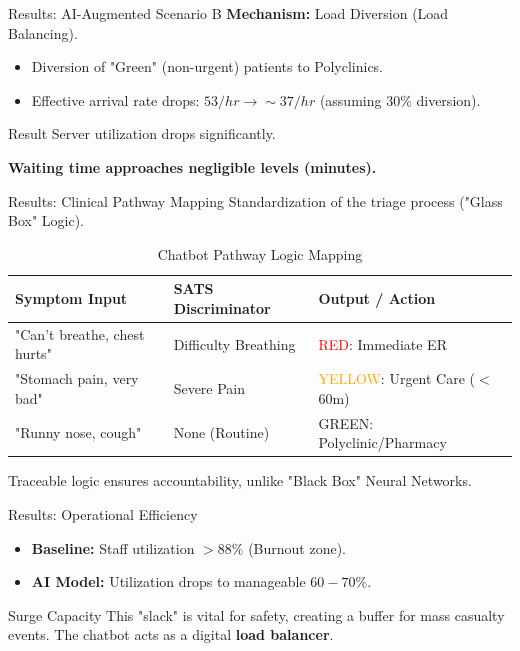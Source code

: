 \documentclass[aspectratio=169,12pt]{beamer}
\newcommand{\bcol}[2][blue]{\textcolor{#1}{#2}}
\begin{document}
	\begin{frame}{Results: AI-Augmented Scenario B}
		\textbf{Mechanism:} Load Diversion (Load Balancing).
		
		\begin{itemize}
			\item Diversion of "Green" (non-urgent) patients to Polyclinics.
			\item Effective arrival rate drops: $53/hr \to \sim 37/hr$ (assuming 30\% diversion).
		\end{itemize}
		
		\begin{block}{Result}
			Server utilization drops significantly.
			\par \textbf{Waiting time approaches negligible levels (minutes).}
		\end{block}
	\end{frame}
	
	\begin{frame}{Results: Clinical Pathway Mapping}
		Standardization of the triage process ("Glass Box" Logic).
		
		\begin{table}[]
			\scriptsize
			\centering
			\begin{tabular}{@{}lll@{}}
				\toprule
				\textbf{Symptom Input} & \textbf{SATS Discriminator} & \textbf{Output / Action} \\ \midrule
				"Can't breathe, chest hurts" & Difficulty Breathing & \bcol[red]{RED}: Immediate ER \\
				"Stomach pain, very bad" & Severe Pain & \bcol[orange]{YELLOW}: Urgent Care ($<$60m) \\
				"Runny nose, cough" & None (Routine) & \bcol[green!60!black]{GREEN}: Polyclinic/Pharmacy \\ \bottomrule
			\end{tabular}
			\caption{Chatbot Pathway Logic Mapping}
		\end{table}
		
		Traceable logic ensures accountability, unlike "Black Box" Neural Networks.
	\end{frame}
	
	\begin{frame}{Results: Operational Efficiency}
		\begin{itemize}
			\item \textbf{Baseline:} Staff utilization $>88\%$ (Burnout zone).
			\item \textbf{AI Model:} Utilization drops to manageable $60-70\%$.
		\end{itemize}
		
		\begin{block}{Surge Capacity}
			This "slack" is vital for safety, creating a buffer for mass casualty events. The chatbot acts as a digital \textbf{load balancer}.
		\end{block}
	\end{frame}
	
\end{document}
